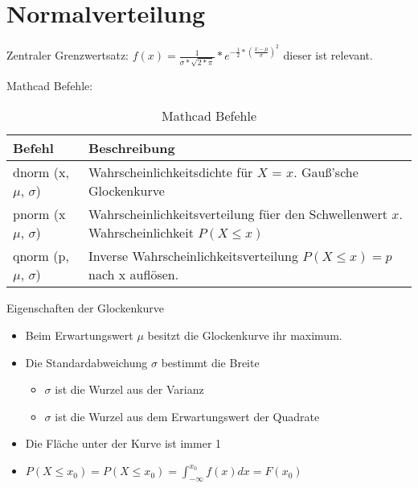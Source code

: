 \section{Normalverteilung}
Zentraler Grenzwertsatz: \begin{math}
    f(x) = \frac{1}{\sigma * \sqrt{2 * \pi}} * e^{-\frac{1}{2} * \left(\frac{x - \mu}{\sigma}\right)^2}
\end{math} dieser ist relevant.

Mathcad Befehle:
\begin{table}[h]
    \caption{Mathcad Befehle}
    \begin{tabularx}{\textwidth}{|l|X|}
        \hline
        \textbf{Befehl}            & \textbf{Beschreibung}                                                                        \\ \hline
        dnorm (x, $\mu$, $\sigma$) & Wahrscheinlichkeitsdichte f\"ur $X$ = $x$. Gau\ss'sche Glockenkurve                          \\ \hline
        pnorm (x $\mu$, $\sigma$)  & Wahrscheinlichkeitsverteilung f\"uer den Schwellenwert $x$. Wahrscheinlichkeit $P(X \leq x)$ \\ \hline
        qnorm (p, $\mu$, $\sigma$) & Inverse Wahrscheinlichkeitsverteilung $P(X \leq x) = p$ nach x aufl\"osen.                   \\ \hline
    \end{tabularx}
\end{table}

Eigenschaften der Glockenkurve
\begin{itemize}
    \item Beim Erwartungswert $\mu$ besitzt die Glockenkurve ihr maximum.
    \item Die Standardabweichung $\sigma$ bestimmt die Breite
          \begin{itemize}
              \item $\sigma$ ist die Wurzel aus der Varianz
              \item $\sigma$ ist die Wurzel aus dem Erwartungswert der Quadrate
          \end{itemize}
    \item Die Fl\"ache unter der Kurve ist immer 1
    \item $P(X \le x_{0}) = P(X \leq x_{0}) = \int_{-\infty}^{x_{0}} f(x) dx = F(x_{0})$
\end{itemize}


